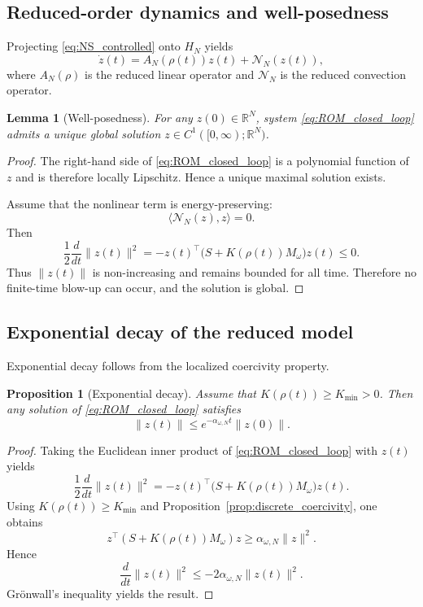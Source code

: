 \documentclass[preprint,12pt]{elsarticle}
\newtheorem{proposition}  [theorem]{Proposition}
\newtheorem{lemma}[theorem]{Lemma}
\begin{document}
\subsection{Reduced-order dynamics and well-posedness}

Projecting \eqref{eq:NS_controlled} onto $H_N$ yields
\begin{equation}
\label{eq:ROM_closed_loop}
\dot z(t) = A_N(\rho(t)) z(t) + \mathcal{N}_N(z(t)),
\end{equation}
where $A_N(\rho)$ is the reduced linear operator and $\mathcal{N}_N$ is the
reduced convection operator.

\begin{lemma}[Well-posedness]
\label{lem:ROM_wellposed}
For any $z(0)\in\mathbb{R}^N$, system \eqref{eq:ROM_closed_loop} admits a unique
global solution $z\in C^1([0,\infty);\mathbb{R}^N)$.
\end{lemma}

\begin{proof}
The right-hand side of \eqref{eq:ROM_closed_loop} is a polynomial function of $z$
and is therefore locally Lipschitz.
Hence a unique maximal solution exists.

Assume that the nonlinear term is energy-preserving:
\[
\langle \mathcal{N}_N(z), z\rangle = 0.
\]
Then
\[
\frac{1}{2}\frac{d}{dt}\|z(t)\|^2
=
- z(t)^\top\big(S + K(\rho(t))M_\omega\big)z(t)
\le 0.
\]
Thus $\|z(t)\|$ is non-increasing and remains bounded for all time.
Therefore no finite-time blow-up can occur, and the solution is global.
\end{proof}

\subsection{Exponential decay of the reduced model}
Exponential decay follows from the localized coercivity property.
\begin{proposition}[Exponential decay]
\label{prop:ROM_decay}
Assume that $K(\rho(t))\ge K_{\min}>0$.
Then any solution of \eqref{eq:ROM_closed_loop} satisfies
\[
\|z(t)\| \le e^{-\alpha_{\omega,N} t}\|z(0)\|.
\]
\end{proposition}

\begin{proof}
Taking the Euclidean inner product of \eqref{eq:ROM_closed_loop} with $z(t)$ yields
\[
\frac{1}{2}\frac{d}{dt}\|z(t)\|^2
=
- z(t)^\top\big(S + K(\rho(t))M_\omega\big)z(t).
\]
Using $K(\rho(t))\ge K_{\min}$ and
Proposition~\ref{prop:discrete_coercivity}, one obtains
\[
z^\top(S + K(\rho(t))M_\omega)z
\ge
\alpha_{\omega,N}\|z\|^2.
\]
Hence
\[
\frac{d}{dt}\|z(t)\|^2 \le -2\alpha_{\omega,N}\|z(t)\|^2.
\]
Gr\"onwall's inequality yields the result.
\end{proof}
\end{document}
